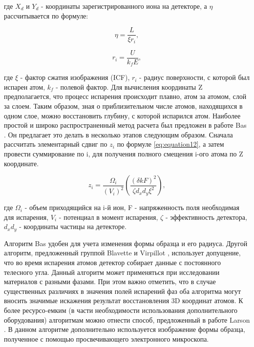 где $X_d$ и $Y_d$ - координаты зарегистрированного иона на детекторе, а $\eta$ рассчитывается по формуле:

\begin{equation}
	\label{eq:equation10}
	\eta = \frac{L}{\xi r_i},
\end{equation}

\begin{equation}
	\label{eq:equation11}
	r_i = \frac{U}{k_f E},
\end{equation}

где $\xi$ - фактор сжатия изображения (ICF), $r_i$ - радиус поверхности, с которой был испарен атом, $k_f$ - полевой фактор. Для вычисления координаты Z предполагается, что процесс испарения происходит плавно, атом за атомом, слой за слоем. Таким образом, зная о приблизительном числе атомов, находящихся в одном слое, можно восстановить глубину, с которой испарился атом. Наиболее простой и широко распространенный метод расчета был предложен в работе Bas \cite{Bas95}. Он предлагает это делать в несколько этапов следующим образом. Сначала рассчитать элементарный сдвиг по $z_i$ по формуле \cref{eq:equation12}, а затем провести суммирование по i, для получения полного смещения i-ого атома по Z координате.

\begin{equation}
	\label{eq:equation12}
	z_i = \frac{\Omega_i}{(V_i)^2} \left(\frac{(\delta k F)^2}{\zeta d_x d_y \xi^2}\right),
\end{equation}

где  $\Omega_i$ - объем приходящийся на i-й ион, F - напряженность поля необходимая для испарения, $V_i$  - потенциал в момент испарения, $\zeta$ - эффективность детектора, $d_x d_y$ - координаты частицы на детекторе.

Алгоритм Bas удобен для учета изменения формы образца и его радиуса. Другой алгоритм, предложенный группой Blavette и Virpillot \cite{Vurpillot11,Gault11}, использует допущение, что во время испарения атомов детектор собирает данные с постоянного телесного угла. Данный алгоритм может применяться при исследовании материалов с разными фазами. При этом важно отметить, что в случае существенных различиях в значения полей испарений фаз оба алгоритма могут вносить значимые искажения результат восстановления 3D координат атомов. К более ресурсо-емким (в части необходимости использования дополнительного оборудования) алгоритмам можно отнести способ, предложенный в работе Larson \cite{Larson11}. В данном алгоритме дополнительно используется изображение формы образца, полученное с помощью просвечивающего электронного микроскопа.

